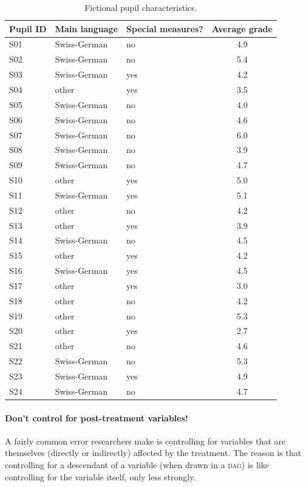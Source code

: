 \documentclass[a4paper]{tufte-book}\usepackage[]{graphicx}\usepackage[]{xcolor}
\begin{document}
\begin{table}[tbp]
\centering
\caption{Fictional pupil characteristics.}
\label{tab:pupils}
\begin{tabular}{@{}lllc@{}}
\toprule
 Pupil ID       & Main language   & Special measures?    & Average grade     \\
 \midrule
 S01            & Swiss-German & no  & 4.9 \\
 S02            & Swiss-German & no  & 5.4 \\
 S03            & Swiss-German & yes & 4.2 \\
 S04            & other        & yes & 3.5 \\
 S05            & Swiss-German & no  & 4.0 \\
 S06            & Swiss-German & no  & 4.6 \\
 S07            & Swiss-German & no  & 6.0 \\
 S08            & Swiss-German & no  & 3.9 \\
 S09            & Swiss-German & no  & 4.7 \\
 S10            & other        & yes & 5.0 \\
 S11            & Swiss-German & yes & 5.1 \\
 S12            & other        & no  & 4.2 \\
 S13            & other        & yes & 3.9 \\
 S14            & Swiss-German & no  & 4.5 \\
 S15            & other        & yes & 4.2 \\
 S16            & Swiss-German & yes & 4.5 \\
 S17            & other        & yes & 3.0 \\
 S18            & other        & no  & 4.2 \\
 S19            & other        & no  & 5.3 \\
 S20            & other        & yes & 2.7 \\
 S21            & other        & no  & 4.6 \\
 S22            & Swiss-German & no  & 5.3 \\
 S23            & Swiss-German & yes & 4.9 \\
 S24            & Swiss-German & no  & 4.7 \\
 \bottomrule
\end{tabular}
\end{table}


\paragraph{Don't control for post-treatment variables!}\label{par:posttreatment}
A fairly common error researchers make is controlling for variables that are themselves
(directly or indirectly) affected by the treatment. The reason is that
controlling for a descendant of a variable (when drawn in a \textsc{dag}) 
is like controlling for the variable itself, only less strongly.
\end{document}
